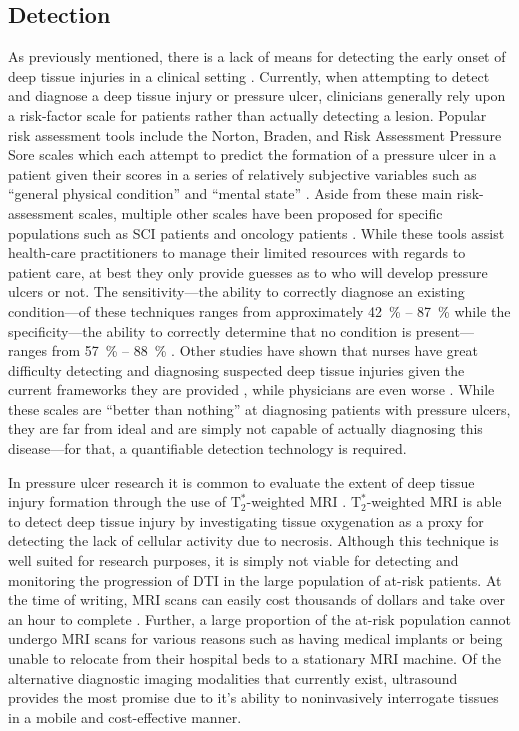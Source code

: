 		\subsection{Detection}
			As previously mentioned, there is a lack of means for detecting the early onset of deep tissue injuries in a clinical setting \cite{gunningberg08,milne09}. Currently, when attempting to detect and diagnose a deep tissue injury or pressure ulcer, clinicians generally rely upon a risk-factor scale for patients rather than actually detecting a lesion. Popular risk assessment tools include the Norton, Braden, and Risk Assessment Pressure Sore scales which each attempt to predict the formation of a pressure ulcer in a patient given their scores in a series of relatively subjective variables such as ``general physical condition'' and ``mental state'' \cite{norton63,braden94,lindgren02}. Aside from these main risk-assessment scales, multiple other scales have been proposed for specific populations such as SCI patients \cite{salzberg96} and oncology patients \cite{fromantin11}. While these tools assist health-care practitioners to manage their limited resources with regards to patient care, at best they only provide guesses as to who will develop pressure ulcers or not. The sensitivity---the ability to correctly diagnose an existing condition---of these techniques ranges from approximately \SI{42}{\percent} -- \SI{87}{\percent} while the specificity---the ability to correctly determine that no condition is present---ranges from \SI{57}{\percent} -- \SI{88}{\percent} \cite{kallman14}. Other studies have shown that nurses have great difficulty detecting and diagnosing suspected deep tissue injuries given the current frameworks they are provided \cite{lee13}, while physicians are even worse \cite{levine12}. While these scales are ``better than nothing'' at diagnosing patients with pressure ulcers, they are far from ideal and are simply not capable of actually diagnosing this disease---for that, a quantifiable detection technology is required.

			In pressure ulcer research it is common to evaluate the extent of deep tissue injury formation through the use of $\mathrm{T}_2^*$-weighted MRI \cite{loerakker11,stekelenburg06,solis12-03}. $\mathrm{T}_2^*$-weighted MRI is able to detect deep tissue injury by investigating tissue oxygenation as a proxy for detecting the lack of cellular activity due to necrosis. Although this technique is well suited for research purposes, it is simply not viable for detecting and monitoring the progression of DTI in the large population of at-risk patients. At the time of writing, MRI scans can easily cost thousands of dollars and take over an hour to complete \cite{wardlaw14,schulthess14,johnson14}. Further, a large proportion of the at-risk population cannot undergo MRI scans for various reasons such as having medical implants or being unable to relocate from their hospital beds to a stationary MRI machine. Of the alternative diagnostic imaging modalities that currently exist, ultrasound provides the most promise due to it's ability to noninvasively interrogate tissues in a mobile and cost-effective manner.


